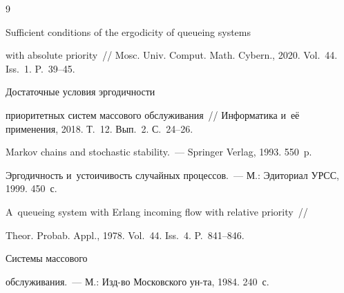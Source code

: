 {\small\frenchspacing

{%


\begin{thebibliography}{9}






 Sufficient conditions of the ergodicity of queueing systems

with absolute priority~/\!\!/ Mosc. Univ. Comput. Math. Cybern., 2020. Vol.~44. Iss.~1. P.~39--45.




 Достаточные условия эргодичности

приоритетных систем массового обслуживания~/\!\!/ Информатика и~её применения, 2018. Т.~12. Вып.~2. С.~24--26.




 Markov chains and stochastic stability.~--- Springer Verlag, 1993. 550~p.




 Эргодичность и~устоичивость случайных процессов.~--- М.: Эдиториал УРСС, 1999. 450~с.




 A~queueing system with Erlang incoming flow with relative priority~/\!\!/ 

Theor. Probab. Appl., 1978. Vol.~44. Iss.~4. P.~841--846.




 Системы массового

обслуживания.~--- М.: Изд-во Московского ун-та, 1984. 240~с.



 \end{thebibliography}

} }





\vspace*{-3pt}



